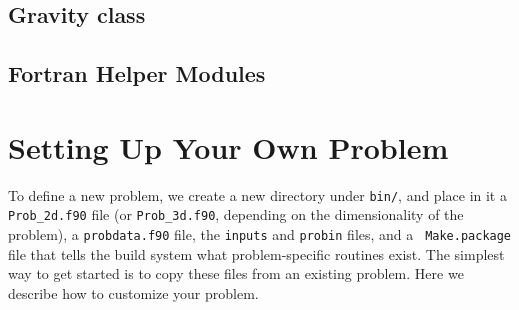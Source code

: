 \subsection{Gravity class}


\subsection{Fortran Helper Modules}


\section{Setting Up Your Own Problem}

To define a new problem, we create a new directory under {\tt bin/},
and place in it a {\tt Prob\_2d.f90} file (or {\tt Prob\_3d.f90},
depending on the dimensionality of the problem), a {\tt probdata.f90}
file, the {\tt inputs} and {\tt probin} files, and a {\tt
  Make.package} file that tells the build system what problem-specific
routines exist.  The
simplest way to get started is to copy these files from an existing
problem.  Here we describe how to customize your problem.

